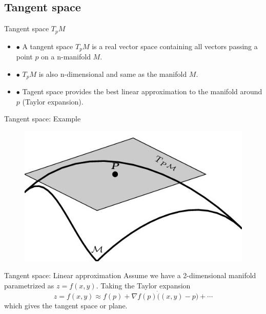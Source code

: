 \documentclass{beamer}
\begin{document}
\subsection{Tangent space}
\begin{frame}{Tangent space $T_{p}M$}
\begin{itemize}
   \item $\bullet$ A tangent space $T_{p}M$ is a real vector space containing all vectors passing a point $p$ on a n-manifold $M$.
   \item $\bullet$ $T_{p}M$ is also n-dimensional and same as the manifold $M$.
   \item $\bullet$ Tagent space provides the best linear approximation to the manifold around $p$ (Taylor expansion).
\end{itemize}
\end{frame}


\begin{frame}{Tangent space: Example}
\begin{figure}
\centering
\includegraphics[width=\textwidth]{tangent_space.jpg}
\end{figure}
\end{frame}

\begin{frame}{Tangent space: Linear approximation}
Assume we have a 2-dimensional manifold parametrized as $z = f(x,y)$. Taking the Taylor expansion
\begin{equation*}
 z = f(x,y) \approx f(p) + \nabla f(p) \dot ((x,y) - p) + \cdots
\end{equation*}
which gives the tangent space or plane.
\end{frame}
\end{document}
